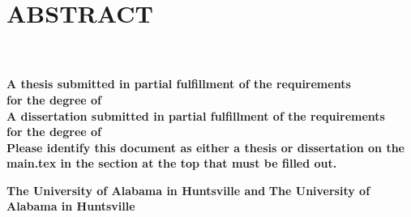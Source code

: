 
\chapter{\texorpdfstring{\MakeUppercase{Abstract}}{Abstract}}
     \begin{center}
        \large
        \singlespacing
        \textbf{\thesistitle}\\
        \vspace{0.5cm}
        \large
        \textbf{\studentname}\\
        \vspace{0.5cm}
        \normalsize
        \ifdefined\thesis
        \textbf{A thesis submitted in partial fulfillment of the requirements \\for the degree of \degree}\\  
        \else
        \ifdefined\dissertation
        \textbf{A dissertation submitted in partial fulfillment of the requirements \\for the degree of \degree}\\ 
        \else
        \textbf{Please identify this document as either a thesis or dissertation on the main.tex in the section at the top that must be filled out.}\\
    \fi
    \fi
        \vspace{1cm}
        \textbf{\department}
        
        \vspace{0.25cm}

        \ifdefined\jointuni
        \textbf{The University of Alabama in Huntsville and  \jointuni}
        \else
        \textbf{The University of Alabama in Huntsville}
    \fi

        
        \vspace{0.1cm}
        \textbf{\gradmonth\ \gradyear}
        


    \end{center}
\vspace{0.1cm}

